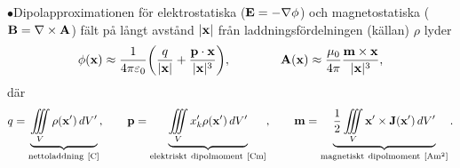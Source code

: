 \item{$\bullet$}{Dipolapproximationen f{\"o}r elektrostatiska
  (${\bf E}=-\nabla\phi$) och magnetostatiska (${\bf B}=\nabla\times{\bf A}$)
  f{\"a}lt p{\aa} l{\aa}ngt avst{\aa}nd $|{\bf x}|$ fr{\aa}n
  laddningsf{\"o}rdelningen (k{\"a}llan) $\rho$ lyder
  $$
    \phi({\bf x})\approx{{1}\over{4\pi\varepsilon_0}}\bigg(
        {{q}\over{|{\bf x}|}} + {{{\bf p}\cdot{\bf x}}\over{|{\bf x}|^3}}
      \bigg),\qquad\qquad
    {\bf A}({\bf x})\approx{{\mu_0}\over{4\pi}}
        {{{\bf m}\times{\bf x}}\over{|{\bf x}|^3}},
  $$
  d{\"a}r
  $$
    q=\underbrace{
        \iiint_{V} \rho({\bf x}')\,dV'
      }_{{\rm nettoladdning}\ [{\rm C}]},\qquad
    {\bf p}=\underbrace{
        \iiint_{V} x'_k \rho({\bf x}')\,dV'
      }_{{\rm elektriskt\ dipolmoment}\ [{\rm C}{\rm m}]},\qquad
    {\bf m}=\underbrace{
        {{1}\over{2}}\iiint_{V} {\bf x}'\times{\bf J}({\bf x}')\,dV'
      }_{{\rm magnetiskt\ dipolmoment}\ [{\rm A}{\rm m}^2]}.
  $$}
\index
\bye
